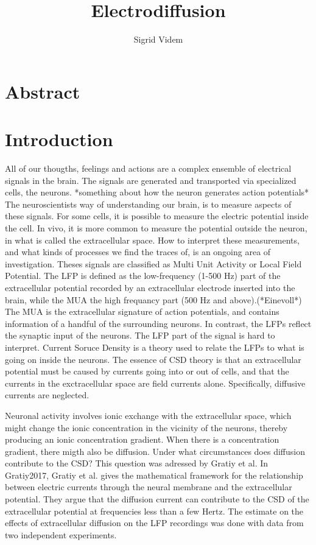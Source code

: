 \documentclass{article}
\author{Sigrid Videm}
\title{Electrodiffusion}
\begin{document}
\maketitle


\section{Abstract} 
\tableofcontents %


\section{Introduction}
All of our thougths, feelings and actions are a complex ensemble of electrical signals in the brain. The signals are generated and transported via specialized cells, the neurons.
*something about how the neuron generates action potentials*
 The neuroscientists way of understanding our brain, is to measure aspects of these signals. For some cells, it is possible to measure the electric potential inside the cell. In vivo, it is more common to measure the potential outside the neuron, in what is called the extracellular space. How to interpret these measurements, and what kinds of processes we find the traces of, is an ongoing area of investigation. Theses signals are classified as Multi Unit Activity or Local Field Potential. The LFP is defined as the low-frequency (1-500 Hz) part of the extracellular potential recorded by an extracellular electrode inserted into the brain, while the MUA the high frequancy part (500 Hz and above).(*Einevoll*) The MUA is the extracellular signature of action potentials, and contains information of a handful of the surrounding neurons. In contrast, the LFPs reflect the synaptic input of the neurons. The LFP part of the signal is hard to interpret. Current Soruce Density is a theory used to relate the LFPs to what is going on inside the neurons. The essence of CSD theory is that an extracellular potential must be caused by currents going into or out of cells, and that the currents in the exctracellular space are field currents alone. Specifically, diffusive currents are neglected. 

Neuronal activity involves ionic exchange with the extracellular space, which might change the ionic concentration in the vicinity of the neurons, thereby producing an ionic concentration gradient. When there is a concentration gradient, there migth also be diffusion. Under what circumstances does diffusion contribute to the CSD? 
This question was adressed by Gratiy et al.
In Gratiy2017, Gratiy et al. gives the mathematical framework for the relationship between electric currents through the neural membrane and the extracellular potential. They argue that the diffusion current can contribute to the CSD of the extracellular potential at frequencies less than a few Hertz. The  estimate on the effects of extracellular diffusion on the LFP recordings was done with data from two independent experiments. 
\end{document}
